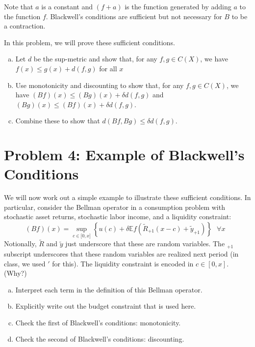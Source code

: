 \documentclass[11pt]{extarticle}
\theoremstyle{plain}
\theoremstyle{definition}
\begin{document}
\noindent
Note that $a$ is a constant and $(f+a)$ is the function generated by adding $a$ to the function $f$. Blackwell's conditions are sufficient but not necessary for $B$ to be a contraction.

\vspace{5mm}
\noindent
In this problem, we will prove these sufficient conditions.
\begin{enumerate}[(a)]
\item Let $d$ be the sup-metric and show that, for any $f, g \in C(X)$, we have $f(x) \leq g(x) + d(f, g)$ for all $x$

\item Use monotonicity and discounting to show that, for any $f, g \in C(X)$, we have $(Bf)(x) \leq (Bg)(x) + \delta d(f, g)$ and $(Bg)(x) \leq (Bf)(x) + \delta d(f, g)$. 

\item Combine these to show that $d(Bf, Bg) \leq \delta d(f, g)$. 
\end{enumerate}



\vspace{5mm}
\section*{Problem 4: Example of Blackwell's Conditions}

We will now work out a simple example to illustrate these sufficient conditions. In particular, consider the Bellman operator in a consumption problem with stochastic asset returns, stochastic labor income, and a liquidity constraint:
\begin{equation*}
	(Bf)(x)=\sup_{c\in \lbrack 0,x]}\left\{ u(c)+\delta \mathbb Ef(\tilde{R}_{+1}(x-c)+
	\tilde{y}_{+1})\right\} \text{ \ }\forall x\text{\ } 
\end{equation*}
Notionally, $\tilde R$ and $\tilde y$ just underscore that these are random variables. The $_{+1}$ subscript underscores that these random variables are realized next period (in class, we used $'$ for this). The liquidity constraint is encoded in $c \in [0, x]$. (Why?)


\vspace{5mm}
\noindent
\begin{enumerate}[(a)]
\item Interpret each term in the definition of this Bellman operator.

\item Explicitly write out the budget constraint that is used here.

\item Check the first of Blackwell's conditions: monotonicity.

\item Check the second of Blackwell's conditions: discounting.
\end{enumerate}
\end{document}
